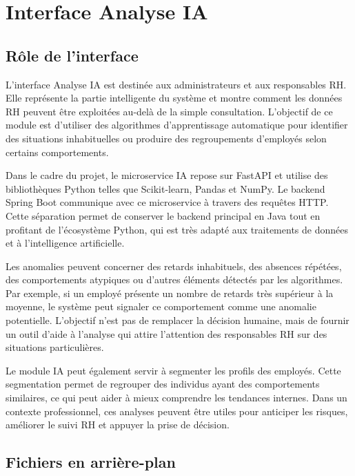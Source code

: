 \documentclass[12pt,a4paper]{report}
\begin{document}
\section{Interface Analyse IA}

\subsection{Rôle de l'interface}

L'interface Analyse IA est destinée aux administrateurs et aux responsables RH. Elle représente la partie intelligente du système et montre comment les données RH peuvent être exploitées au-delà de la simple consultation. L'objectif de ce module est d'utiliser des algorithmes d'apprentissage automatique pour identifier des situations inhabituelles ou produire des regroupements d'employés selon certains comportements.

Dans le cadre du projet, le microservice IA repose sur FastAPI et utilise des bibliothèques Python telles que Scikit-learn, Pandas et NumPy. Le backend Spring Boot communique avec ce microservice à travers des requêtes HTTP. Cette séparation permet de conserver le backend principal en Java tout en profitant de l'écosystème Python, qui est très adapté aux traitements de données et à l'intelligence artificielle.

Les anomalies peuvent concerner des retards inhabituels, des absences répétées, des comportements atypiques ou d'autres éléments détectés par les algorithmes. Par exemple, si un employé présente un nombre de retards très supérieur à la moyenne, le système peut signaler ce comportement comme une anomalie potentielle. L'objectif n'est pas de remplacer la décision humaine, mais de fournir un outil d'aide à l'analyse qui attire l'attention des responsables RH sur des situations particulières.

Le module IA peut également servir à segmenter les profils des employés. Cette segmentation permet de regrouper des individus ayant des comportements similaires, ce qui peut aider à mieux comprendre les tendances internes. Dans un contexte professionnel, ces analyses peuvent être utiles pour anticiper les risques, améliorer le suivi RH et appuyer la prise de décision.

\subsection{Fichiers en arrière-plan}
\end{document}
